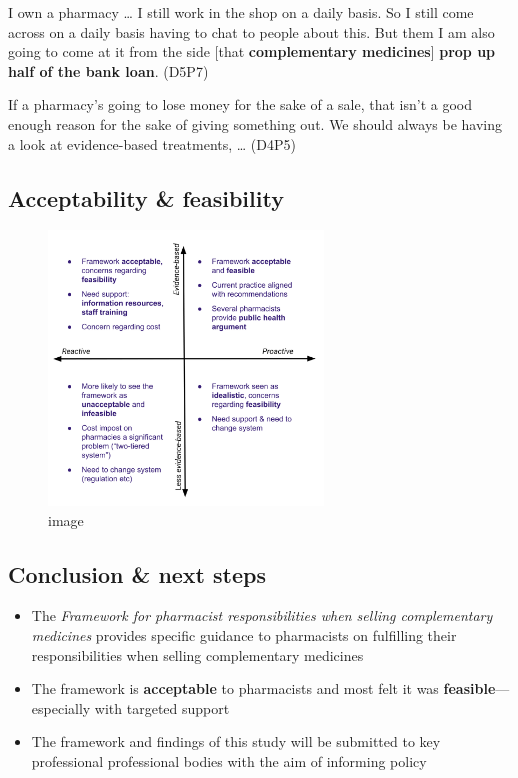 \documentclass[]{article}
\begin{document}
I own a pharmacy \ldots{} I still work in the shop on a daily basis. So
I still come across on a daily basis having to chat to people about
this. But them I am also going to come at it from the side {[}that
\textbf{complementary medicines}{]} \textbf{prop up half of the bank
loan}. (D5P7)

If a pharmacy's going to lose money for the sake of a sale, that isn't a
good enough reason for the sake of giving something out. We should
always be having a look at evidence-based treatments, \ldots{} (D4P5)

\subsection{Acceptability \&
feasibility}\label{acceptability-feasibility}

\begin{figure}
\centering
\includegraphics[width=0.65000\textwidth]{files/CMEthics_accfeas.png}
\caption{image}
\end{figure}

\subsection{Conclusion \& next steps}\label{conclusion-next-steps}

\begin{itemize}
\item
  The \emph{Framework for pharmacist responsibilities when selling
  complementary medicines} provides specific guidance to pharmacists on
  fulfilling their responsibilities when selling complementary medicines
\item
  The framework is \textbf{acceptable} to pharmacists and most felt it
  was \textbf{feasible}---especially with targeted support
\item
  The framework and findings of this study will be submitted to key
  professional professional bodies with the aim of informing policy
\end{itemize}
\end{document}
